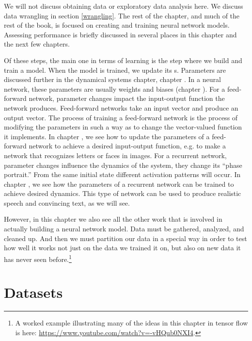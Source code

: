 We will not discuss obtaining data or exploratory data analysis here. We discuss data wrangling in section \ref{wrangling}. The rest of the chapter, and much of the rest of the book, is focused on creating and training neural network models. Assessing performance is briefly discussed in several places in this chapter and the next few chapters.

Of these steps, the main one in terms of learning is the step where we build and train a model. When the model is trained, we update its s. Parameters are discussed further in the dynamical systems chapter, chapter . In a neural network, these parameters are usually weights and biases (chapter ). For a feed-forward network, parameter changes impact the input-output function the network produces. Feed-forward networks take an input vector and produce an output vector. The process of training a feed-forward network is the process of modifying the parameters in such  a way as to change the vector-valued function it implements. In chapter , we see how to update the parameters of a feed-forward network to achieve a desired input-output function, e.g. to make a network that recognizes letters or faces in images.  For a recurrent network, parameter changes influence the dynamics of the system, they change its ``phase portrait.'' From the same initial state different activation patterns will occur. In chapter , we see how the parameters of a recurrent network can be trained to achieve desired dynamics. This type of network can be used to produce realistic speech and convincing text, as we will see.

However, in this chapter we also see all the other work that is involved in actually building a neural network model. Data must be gathered, analyzed, and cleaned up. And then we must partition our data in a special way in order to test how well it works not just on the data we trained it on, but also on new data it has never seen before.\footnote{A worked example illustrating many of the ideas in this chapter in tensor flow is here: \url{https://www.youtube.com/watch?v=-vHQub0NXI4}.}

\section{Datasets}

